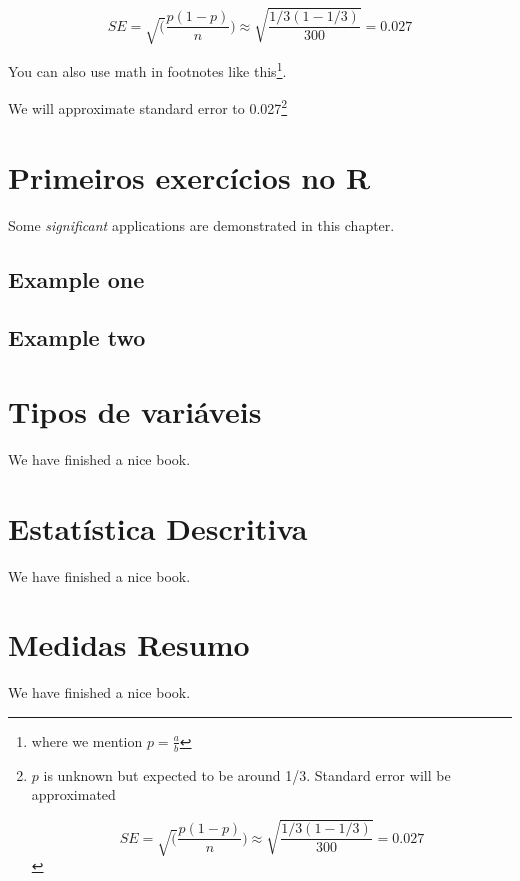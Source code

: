 \documentclass[
]{book}
\begin{document}
\[
SE = \sqrt(\frac{p(1-p)}{n}) \approx \sqrt{\frac{1/3 (1 - 1/3)} {300}} = 0.027
\]

You can also use math in footnotes like this\footnote{where we mention \(p = \frac{a}{b}\)}.

We will approximate standard error to 0.027\footnote{\(p\) is unknown but expected to be around 1/3. Standard error will be approximated

  \[
  SE = \sqrt(\frac{p(1-p)}{n}) \approx \sqrt{\frac{1/3 (1 - 1/3)} {300}} = 0.027
  \]}

\hypertarget{primeiros-exercuxedcios-no-r}{%
\chapter{Primeiros exercícios no R}\label{primeiros-exercuxedcios-no-r}}

Some \emph{significant} applications are demonstrated in this chapter.

\hypertarget{example-one}{%
\section{Example one}\label{example-one}}

\hypertarget{example-two}{%
\section{Example two}\label{example-two}}

\hypertarget{tipos-de-variuxe1veis}{%
\chapter{Tipos de variáveis}\label{tipos-de-variuxe1veis}}

We have finished a nice book.

\hypertarget{estatuxedstica-descritiva}{%
\chapter{Estatística Descritiva}\label{estatuxedstica-descritiva}}

We have finished a nice book.

\hypertarget{medidas-resumo}{%
\chapter{Medidas Resumo}\label{medidas-resumo}}

We have finished a nice book.
\end{document}
